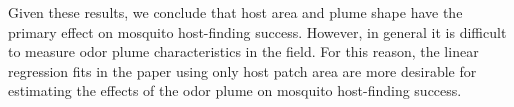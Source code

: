 \documentclass[10pt]{article}
\begin{document}
Given these results, we conclude that host area and plume shape have the primary effect on mosquito host-finding success. However, in general it is difficult to measure odor plume characteristics in the field. For this reason, the linear regression fits in the paper using only host patch area are more desirable for estimating the effects of the odor plume on mosquito host-finding success.
\end{document}

